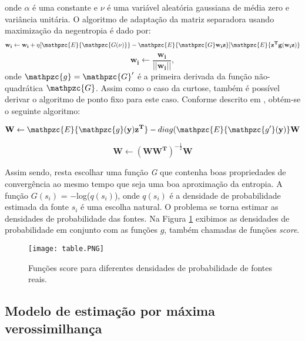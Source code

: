     onde $\alpha$ é uma constante e $\nu$ é uma variável aleatória gaussiana de média zero e variância unitária.  O algoritmo de adaptação da matriz separadora usando maximização da negentropia é dado por:
    \begin{equation}
          \mathbf{w_i} \leftarrow  \mathbf{w_i} + \eta[\mathpzc{E}\{\mathpzc{G(\nu)}\} - \mathpzc{E}\{\mathpzc{G}\mathbf{w_iz}\}]\mathpzc{E}\{\mathbf{z^Tg(w_iz)}\}
    \end{equation}
    \begin{equation}
          \mathbf{w_i} \leftarrow  \frac{\mathbf{w_i}}{||\mathbf{w_i}||},
    \end{equation}
    onde $\mathpzc{g} = \mathpzc{G}'$ é a primeira derivada da função não-quadrática $\mathpzc{G}$.
    Assim como o caso da curtose, também é possível derivar o algoritmo de ponto fixo para este caso. Conforme descrito em \cite{LuizVictorio}, obtém-se o seguinte algoritmo:
    
    \begin{equation}
        \mathbf{W} \leftarrow \mathpzc{E}\{\mathpzc{g}\mathbf{(y)z^T}\} - diag(\mathpzc{E}\{\mathpzc{g'}\mathbf{(y)}\}\mathbf{W}
    \end{equation}
    
    \begin{equation}
        \mathbf{W} \leftarrow (\mathbf{WW^T})^{-\frac{1}{2}}\mathbf{W}
    \end{equation}
    
    
    Assim sendo, resta escolhar uma função \textit{G} que contenha boas propriedades de convergência ao mesmo tempo que seja uma boa aproximação da entropia. A função $G(s_i)$ = $-$log($q(s_i)$), onde $q(s_i)$ é a densidade de probabilidade estimada da fonte $s_i$ é uma escolha natural. O problema se torna estimar as densidades de probabilidade das fontes. Na Figura \ref{fig:scoretable} exibimos as densidades de probabilidade em conjunto com as funções $g$, também chamadas de funções \textit{score}.
    
    \begin{figure}
        \centering
        \texttt{[image: table.PNG]}
        \caption{Funções score para diferentes densidades de probabilidade de fontes reais.}
        \label{fig:scoretable}
    \end{figure}
    
\subsection{Modelo de estimação por máxima verossimilhança}

